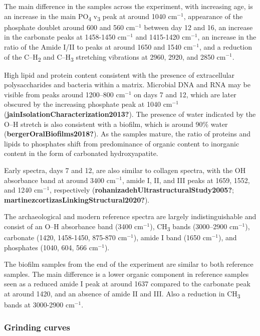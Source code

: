 \documentclass[
]{article}
\begin{document}
The main difference in the samples across the experiment, with
increasing age, is an increase in the main PO\textsubscript{4}
v\textsubscript{3} peak at around 1040 cm\(^{-1}\), appearance of the
phosphate doublet around 600 and 560 cm\(^{-1}\) between day 12 and 16,
an increase in the carbonate peaks at 1458-1450 cm\(^{-1}\) and
1415-1420 cm\(^{-1}\), an increase in the ratio of the Amide I/II to
peaks at around 1650 and 1540 cm\(^{-1}\), and a reduction of the
C--H\textsubscript{2} and C--H\textsubscript{3} stretching vibrations at
2960, 2920, and 2850 cm\(^{-1}\).

High lipid and protein content consistent with the presence of
extracellular polysaccharides and bacteria within a matrix. Microbial
DNA and RNA may be visible from peaks around 1200--800 cm\(^{-1}\) on
days 7 and 12, which are later obscured by the increasing phosphate peak
at 1040 cm\(^{-1}\) (\textbf{jainIsolationCharacterization2013?}). The
presence of water indicated by the O--H stretch is also consistent with
a biofilm, which is around 90\% water
(\textbf{bergerOralBiofilms2018?}). As the samples mature, the ratio of
proteins and lipids to phosphates shift from predominance of organic
content to inorganic content in the form of carbonated hydroxyapatite.

Early spectra, days 7 and 12, are also similar to collagen spectra, with
the OH absorbance band at around 3400 cm\(^{-1}\), amide I, II, and III
peaks at 1659, 1552, and 1240 cm\(^{-1}\), respectively
(\textbf{rohanizadehUltrastructuralStudy2005?};
\textbf{martinezcortizasLinkingStructural2020?}).

The archaeological and modern reference spectra are largely
indistinguishable and consist of an O--H absorbance band (3400
cm\(^{-1}\)), CH\textsubscript{3} bands (3000--2900 cm\(^{-1}\)),
carbonate (1420, 1458-1450, 875-870 cm\(^{-1}\)), amide I band (1650
cm\(^{-1}\)), and phosphates (1040, 604, 566 cm\(^{-1}\)).

The biofilm samples from the end of the experiment are similar to both
reference samples. The main difference is a lower organic component in
reference samples seen as a reduced amide I peak at around 1637 compared
to the carbonate peak at around 1420, and an absence of amide II and
III. Also a reduction in CH\textsubscript{3} bands at 3000-2900
cm\(^{-1}\).

\hypertarget{grinding-curves}{%
\subsubsection{Grinding curves}\label{grinding-curves}}
\end{document}
